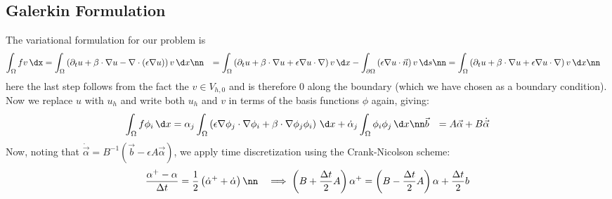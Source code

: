 \subsection{Galerkin Formulation}
The variational formulation for our problem is
\begin{align}
  \int_\Omega fv\,\dx &= \int_\Omega \left(\partial_t u + \beta\cdot\nabla u - \nabla\cdot\left(\epsilon\nabla u\right)\right)v\,\d x\nn
  &=\int_\Omega \left(\partial_t u + \beta\cdot\nabla u + \epsilon\nabla u \cdot \nabla\right) v\,\d x - \int_{\partial\Omega}\left(\epsilon\nabla u \cdot \vec n\right)v\,\d s\nn
  &=\int_\Omega \left(\partial_t u + \beta\cdot\nabla u + \epsilon\nabla u \cdot \nabla\right)v\,\d x\nn
\end{align}
here the last step follows from the fact the $v \in V_{h,0}$ and is therefore 0 along the boundary (which we have chosen as a boundary condition).
Now we replace $u$ with $u_h$ and write both $u_h$ and $v$ in terms of the basis functions $\phi$ again, giving:
\begin{align}
  \int_\Omega f\phi_i\,\d x &= \alpha_j\int_\Omega\left(\epsilon \nabla\phi_j\cdot\nabla\phi_i +\beta\cdot\nabla \phi_j\phi_i\right)\,\d x + \dot \alpha_j\int_\Omega \phi_i\phi_j\,\d x\nn
  \vec b &= A \vec \alpha + B \dot{\vec \alpha}
\end{align}
Now, noting that $\dot{\vec \alpha} = B^{-1}\left(\vec b - \epsilon A \vec \alpha\right)$, we apply time discretization using the Crank-Nicolson scheme:
\begin{align}
&\frac{\alpha^+-\alpha}{\Delta t} = \frac{1}{2}\left(\dot\alpha^++\dot\alpha\right)\nn
&\implies \left(B+\frac{\Delta t}{2}A\right)\alpha^+ = \left(B-\frac{\Delta t}{2}A\right)\alpha+\frac{\Delta t}{2}b
\end{align}

